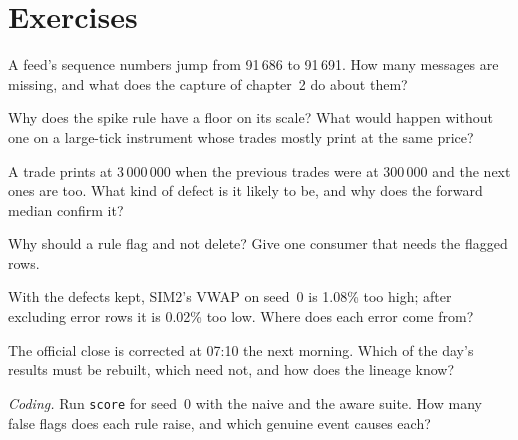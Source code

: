 \section{Exercises}

\begin{exercise}[$\star$]\label{exo:pl:data-quality-and-lineage:1}
A feed's sequence numbers jump from 91\,686 to 91\,691. How many messages are missing, and what does the capture of chapter~2 do
about them?
\end{exercise}

\begin{exercise}[$\star$]\label{exo:pl:data-quality-and-lineage:2}
Why does the spike rule have a floor on its scale? What would happen without one on a large-tick instrument whose trades mostly
print at the same price?
\end{exercise}

\begin{exercise}[$\star$]\label{exo:pl:data-quality-and-lineage:3}
A trade prints at 3\,000\,000 when the previous trades were at 300\,000 and the next ones are too. What kind of defect is it likely
to be, and why does the forward median confirm it?
\end{exercise}

\begin{exercise}[$\star\star$]\label{exo:pl:data-quality-and-lineage:4}
Why should a rule flag and not delete? Give one consumer that needs the flagged rows.
\end{exercise}

\begin{exercise}[$\star\star$]\label{exo:pl:data-quality-and-lineage:5}
With the defects kept, SIM2's VWAP on seed~0 is 1.08\% too high; after excluding error rows it is 0.02\% too low. Where does each
error come from?
\end{exercise}

\begin{exercise}[$\star\star$]\label{exo:pl:data-quality-and-lineage:6}
The official close is corrected at 07:10 the next morning. Which of the day's results must be rebuilt, which need not, and how does
the lineage know?
\end{exercise}

\begin{exercise}[$\star\star\star$]\label{exo:pl:data-quality-and-lineage:7}
\emph{Coding.} Run \texttt{score} for seed~0 with the naive and the aware suite. How many false flags does each rule raise, and
which genuine event causes each?
\end{exercise}

